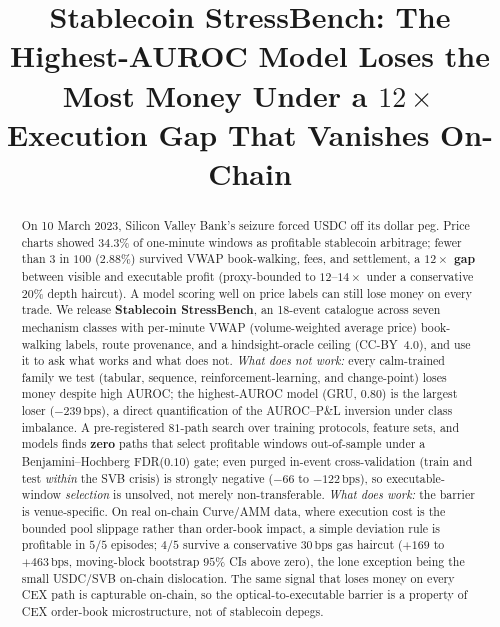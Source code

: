 \documentclass[sigconf,anonymous,natbib=false]{acmart}
\newcommand{\bps}{\,\text{bps}}
\begin{document}
\title{Stablecoin StressBench: The Highest-AUROC Model Loses the Most
Money Under a \texorpdfstring{$12\times$}{12x} Execution Gap That Vanishes On-Chain}

\begin{abstract}\sloppy
On 10 March 2023, Silicon Valley Bank's seizure forced USDC off its
dollar peg. Price charts showed $34.3\%$ of one-minute windows as
profitable stablecoin arbitrage; fewer than $3$ in $100$ ($2.88\%$)
survived VWAP book-walking, fees, and settlement, a \textbf{$12\times$
gap} between visible and executable profit (proxy-bounded to $12$--$14\times$
under a conservative $20\%$ depth haircut).  A model scoring well on
price labels can still lose money on every trade.
We release \textbf{Stablecoin StressBench}, an 18-event catalogue across
seven mechanism classes with per-minute VWAP (volume-weighted average
price) book-walking labels, route provenance, and a hindsight-oracle
ceiling (CC-BY~4.0), and use it to ask what works and what does not.
\emph{What does not work:} every calm-trained family we test (tabular,
sequence, reinforcement-learning, and change-point) loses money despite high
AUROC; the highest-AUROC model (GRU, $0.80$) is the largest loser ($-239\bps$),
a direct quantification of the AUROC--P\&L inversion under class imbalance.
A pre-registered $81$-path search over training protocols, feature sets, and
models finds \textbf{zero} paths that select profitable windows out-of-sample
under a Benjamini--Hochberg FDR($0.10$) gate; even purged in-event
cross-validation (train and test \emph{within} the SVB crisis) is strongly
negative ($-66$ to $-122\bps$), so executable-window \emph{selection} is
unsolved, not merely non-transferable.
\emph{What does work:} the barrier is venue-specific. On real on-chain
Curve/AMM data, where execution cost is the bounded pool slippage rather than
order-book impact, a simple deviation rule is profitable in $5/5$ episodes;
$4/5$ survive a conservative $30\bps$ gas haircut ($+169$ to $+463\bps$,
moving-block bootstrap $95\%$ CIs above zero), the lone exception being the
small USDC/SVB on-chain dislocation. The same signal that loses money on every
CEX path is capturable on-chain, so the optical-to-executable barrier is a
property of CEX order-book microstructure, not of stablecoin depegs.
\end{abstract}

\end{document}
